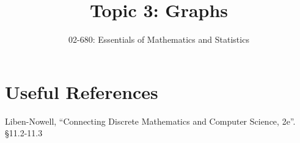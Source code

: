 


\title{Topic 3: Graphs}
\author{02-680: Essentials of Mathematics and Statistics}


\maketitle


\section*{Useful References}
Liben-Nowell, ``Connecting Discrete Mathematics and Computer Science, 2e''. \S 11.2-11.3

